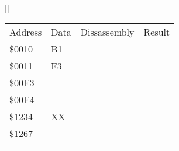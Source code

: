 \documentclass[letterpaper,10pt,english]{sphinxmanual}
\begin{document}
\begin{savenotes}
\begin{tabular}[t]{|*{1}{|}}
\begin{savenotes}\sphinxattablestart
\sphinxthistablewithglobalstyle
\centering
\begin{tabulary}{\linewidth}[t]{|T|T|T|T|}
\sphinxtoprule
\sphinxstyletheadfamily 
\sphinxAtStartPar
Address
&\sphinxstyletheadfamily 
\sphinxAtStartPar
Data
&\sphinxstyletheadfamily 
\sphinxAtStartPar
Dissassembly
&\sphinxstyletheadfamily 
\sphinxAtStartPar
Result
\\
\sphinxmidrule
\sphinxtableatstartofbodyhook
\sphinxAtStartPar
\$0010
&
\sphinxAtStartPar
B1
&%
&%
\\
\sphinxAtStartPar
\$0011
&
\sphinxAtStartPar
F3
&&\\
\sphinxAtStartPar
\$00F3
&
&&\\
\sphinxAtStartPar
\$00F4
&
&&\\
\sphinxAtStartPar
\$1234
&
\sphinxAtStartPar
XX
&&\\
\sphinxAtStartPar
\$1267
&
&&\\
\sphinxbottomrule
\end{tabulary}
\sphinxtableafterendhook\par
\sphinxattableend\end{savenotes}
\\
\sphinxbottomrule
\end{tabular}
\sphinxtableafterendhook\par
\sphinxattableend\end{savenotes}
\end{document}
